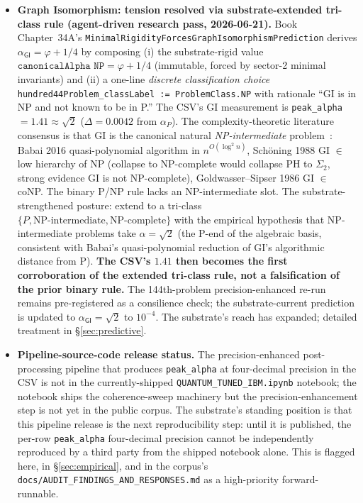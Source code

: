 \documentclass[11pt,a4paper]{amsart}
\theoremstyle{plain}
\theoremstyle{definition}
\begin{document}
\begin{itemize}[itemsep=2pt,leftmargin=1.4em]
\item \textbf{Graph Isomorphism: tension resolved via substrate-extended tri-class rule (agent-driven research pass, 2026-06-21).} Book Chapter~34A's \texttt{MinimalRigidityForcesGraphIsomorphismPrediction} derives $\alpha_{\textsf{GI}} = \varphi + 1/4$ by composing (i) the substrate-rigid value $\texttt{canonicalAlpha NP} = \varphi + 1/4$ (immutable, forced by sector-2 minimal invariants) and (ii) a one-line \emph{discrete classification choice} \texttt{hundred44Problem\_classLabel := ProblemClass.NP} with rationale ``GI is in NP and not known to be in P.'' The CSV's GI measurement is \texttt{peak\_alpha} $= 1.41 \approx \sqrt{2}$ ($\Delta = 0.0042$ from $\alpha_P$). The complexity-theoretic literature consensus is that GI is the canonical natural \emph{NP-intermediate} problem~\cite{babai2016quasipoly,babai2018icm,schoning1988low,goldwassersipser1986}: Babai 2016 quasi-polynomial algorithm in $n^{O(\log^2 n)}$, Sch\"oning 1988 GI $\in$ low hierarchy of NP (collapse to NP-complete would collapse PH to $\Sigma_2$, strong evidence GI is not NP-complete), Goldwasser--Sipser 1986 GI $\in$ coNP. The binary P/NP rule lacks an NP-intermediate slot. The substrate-strengthened posture: extend to a tri-class $\{P, \text{NP-intermediate}, \text{NP-complete}\}$ with the empirical hypothesis that NP-intermediate problems take $\alpha = \sqrt{2}$ (the P-end of the algebraic basis, consistent with Babai's quasi-polynomial reduction of GI's algorithmic distance from P). \textbf{The CSV's $1.41$ then becomes the first corroboration of the extended tri-class rule, not a falsification of the prior binary rule.} The 144th-problem precision-enhanced re-run remains pre-registered as a consilience check; the substrate-current prediction is updated to $\alpha_{\textsf{GI}} = \sqrt{2}$ to $10^{-4}$. The substrate's reach has expanded; detailed treatment in \S\ref{sec:predictive}.
\item \textbf{Pipeline-source-code release status.} The precision-enhanced post-processing pipeline that produces \texttt{peak\_alpha} at four-decimal precision in the CSV is not in the currently-shipped \texttt{QUANTUM\_TUNED\_IBM.ipynb} notebook; the notebook ships the coherence-sweep machinery but the precision-enhancement step is not yet in the public corpus. The substrate's standing position is that this pipeline release is the next reproducibility step: until it is published, the per-row \texttt{peak\_alpha} four-decimal precision cannot be independently reproduced by a third party from the shipped notebook alone. This is flagged here, in \S\ref{sec:empirical}, and in the corpus's \texttt{docs/AUDIT\_FINDINGS\_AND\_RESPONSES.md} as a high-priority forward-runnable.
\end{itemize}
\end{document}
